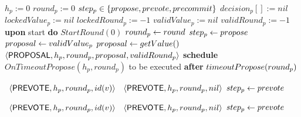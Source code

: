 \begin{algorithm}[htb!] \def\baselinestretch{1} \scriptsize\raggedright
	\begin{algorithmic}[1] 
		\SHORTSPACE 
		\INIT{} 
		\STATE $h_p := 0$  
		\STATE $round_p := 0$   
		\STATE $step_p  \in \left\{propose, prevote, precommit\right\}$
		\STATE $decision_p[] := nil$ 
		\STATE $lockedValue_p := nil$ 
		\STATE $lockedRound_p := -1$ 
		\STATE $validValue_p := nil$ 
		\STATE $validRound_p := -1$ 
		\ENDINIT 
		\SHORTSPACE 
		\STATE \textbf{upon} start \textbf{do} $StartRound(0)$ 
		\SHORTSPACE 
		 \label{line:tab:startRound} 
		\STATE $round_p \leftarrow round$ 
		\STATE $step_p \leftarrow propose$ 
		 \label{line:tab:isThereLockedValue}
		\STATE $proposal \leftarrow validValue_p$ \ELSE \STATE $proposal \leftarrow
		getValue()$ 
		\label{line:tab:getValidValue} 
		\ENDIF 	  
		\STATE \Broadcast\ $\langle\mathsf{PROPOSAL},h_p, round_p, proposal, validRound_p\rangle$
		\label{line:tab:send-proposal} 
		\ELSE 
		\STATE \textbf{schedule} $OnTimeoutPropose(h_p,
		round_p)$ to be executed \textbf{after} $timeoutPropose(round_p)$ 
		\ENDIF
		\ENDFUNCTION
		
		\SPACE 
		 \label{line:tab:recvProposal}
			\label{line:tab:accept-proposal-2} 
				\STATE \Broadcast \ $\langle\mathsf{PREVOTE},h_p,round_p,id(v)\rangle$  
				\label{line:tab:prevote-proposal}	
			\ELSE
			\label{line:tab:acceptProposal1}		
				\STATE \Broadcast \ $\langle\mathsf{PREVOTE},h_p,round_p,nil\rangle$  
				\label{line:tab:prevote-nil}	
			\ENDIF
				\STATE $step_p \leftarrow prevote$ \label{line:tab:setStateToPrevote1} 
		\ENDUPON
		
		\SPACE 
		\label{line:tab:acceptProposal} 
		 \label{line:tab:cond-prevote-higher-proposal}	
			\STATE \Broadcast \ $\langle\mathsf{PREVOTE},h_p,round_p,id(v)\rangle$
			\label{line:tab:prevote-higher-proposal}		 
		\ELSE
			\label{line:tab:acceptProposal2}		
			\STATE \Broadcast \ $\langle\mathsf{PREVOTE},h_p,round_p,nil\rangle$  
			\label{line:tab:prevote-nil2}	
		\ENDIF
		\STATE $step_p \leftarrow prevote$ \label{line:tab:setStateToPrevote3} 	 
		\ENDUPON
		

\end{algorithmic}
\end{algorithm}
